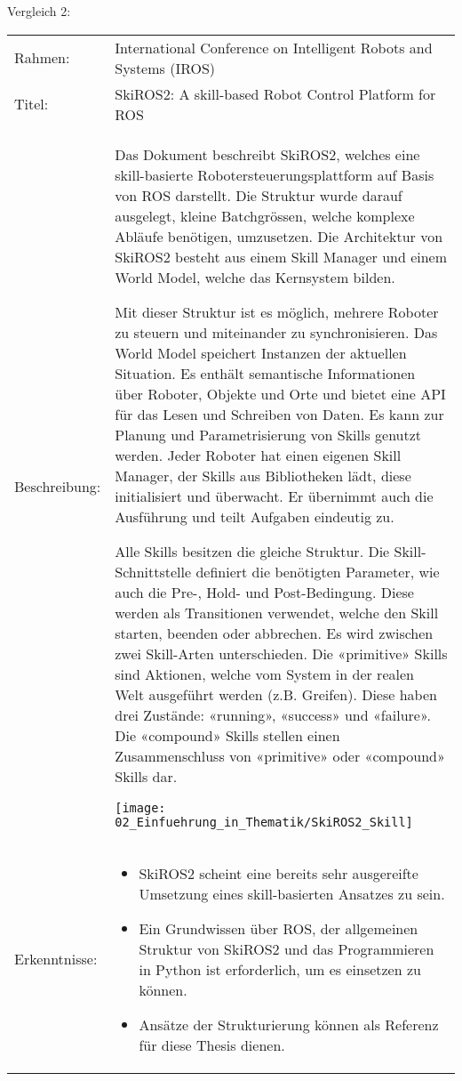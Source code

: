 	\newpage
	
	Vergleich 2:
	\vspace{2mm}
	\\
	\begin{tabularx}{\textwidth}{@{}>{}p{8em} X@{}}
		Rahmen: & 
		International Conference on Intelligent Robots and Systems (IROS)
		\\
		
		Titel: & 
		SkiROS2: A skill-based Robot Control Platform for ROS \cite{Vergleich_2} 
		\\
		
		Beschreibung: & 
		Das Dokument beschreibt SkiROS2, welches eine skill-basierte Robotersteuerungsplattform auf Basis von \Gls{ROS} darstellt.  Die Struktur wurde darauf ausgelegt, kleine Batchgrössen, welche komplexe Abläufe benötigen, umzusetzen.  Die Architektur von SkiROS2 besteht aus einem Skill Manager und einem World Model, welche das Kernsystem bilden.
		
		Mit dieser Struktur ist es möglich, mehrere Roboter zu steuern und miteinander zu synchronisieren. Das World Model speichert Instanzen der aktuellen Situation. Es enthält semantische Informationen über Roboter, Objekte und Orte und bietet eine API für das Lesen und Schreiben von Daten. Es kann zur Planung und Parametrisierung von Skills genutzt werden. Jeder Roboter hat einen eigenen Skill Manager, der Skills aus Bibliotheken lädt, diese initialisiert und überwacht. Er übernimmt auch die Ausführung und teilt Aufgaben eindeutig zu.
		
		Alle Skills besitzen die gleiche Struktur. Die Skill-Schnittstelle definiert die benötigten Parameter, wie auch die Pre-, Hold- und Post-Bedingung. Diese werden als Transitionen verwendet, welche den Skill starten, beenden oder abbrechen. Es wird zwischen zwei Skill-Arten unterschieden. Die «primitive» Skills sind Aktionen, welche vom System in der realen Welt ausgeführt werden (z.B. Greifen). Diese haben drei Zustände: «running», «success» und «failure». Die «compound» Skills stellen einen Zusammenschluss von «primitive» oder «compound» Skills dar. 
		
		\texttt{[image: 02\_Einfuehrung\_in\_Thematik/SkiROS2\_Skill]}
		\\
		
		Erkenntnisse: & 
		\begin{itemize}
			\item SkiROS2 scheint eine bereits sehr ausgereifte Umsetzung eines skill-basierten Ansatzes zu sein.
			\item Ein Grundwissen über ROS, der allgemeinen Struktur von SkiROS2 und das Programmieren in Python ist erforderlich, um es einsetzen zu können.
			\item Ansätze der Strukturierung können als Referenz für diese Thesis dienen.
		\end{itemize}
	\end{tabularx}
	
